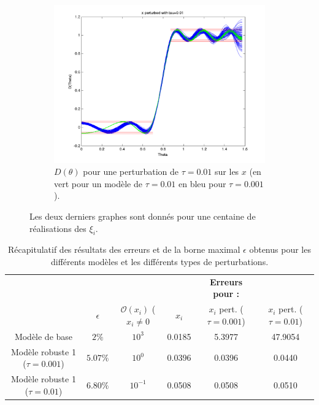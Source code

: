 \begin{figure}[h!]
\begin{subfigure}[b]{0.32\textwidth}
  \end{subfigure}
  ~ 
  \begin{subfigure}[b]{0.32\textwidth}
  \includegraphics[width=\textwidth]{D-ModRobust1-test3Rob01.png}
  \caption{$D(\theta)$ pour une perturbation de $\tau = 0.01$ sur les $x$ (en vert pour un modèle de $\tau=0.01$ en bleu pour $\tau=0.001$).}
  \label{fig:D-ModRobust1-test3RobTau01}
  \end{subfigure}
\caption{Les deux derniers graphes sont donnés pour une centaine de réalisations des $\xi_i$.}
\label{fig:ModROBUST1}
  \end{figure}

\begin{table}
\centering
\begin{tabular}{c|c|c|ccc}
 & & &  &\textbf{Erreurs pour : } &\\
 & $\epsilon$ & $\mathcal{O}( x_i)$ ($x_i\neq0$ &$x_i$ & $x_i$ pert. ($\tau=0.001$) & $x_i$ pert. ($\tau=0.01$) \\
 \hline
Modèle de base & $2\%$ & $10^3$ &0.0185 & 5.3977 & 47.9054 \\
Modèle robuste 1 ($\tau=0.001$) & $5.07 \%$ & $10^0$& 0.0396 & 0.0396  & 0.0440 \\
Modèle robuste 1 ($\tau=0.01$)  & $6.80 \%$ &$10^{-1}$ &0.0508 & 0.0508 & 0.0510 \\
\end{tabular}
\caption{Récapitulatif des résultats des erreurs et de la borne maximal $\epsilon$ obtenus pour les différents modèles et les différents types de perturbations.}
\label{table:Recap}
\end{table}
\FloatBarrier